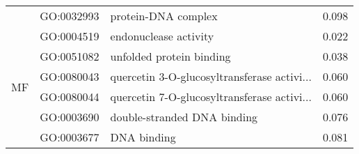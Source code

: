 \begin{longtable}{lllr}
   & GO:0032993 &                          protein-DNA complex &         0.098 \\
\cline{1-4}
\multirow{6}{*}{MF} & GO:0004519 &                        endonuclease activity &         0.022 \\
   & GO:0051082 &                     unfolded protein binding &         0.038 \\
   & GO:0080043 &  quercetin 3-O-glucosyltransferase activi... &         0.060 \\
   & GO:0080044 &  quercetin 7-O-glucosyltransferase activi... &         0.060 \\
   & GO:0003690 &                  double-stranded DNA binding &         0.076 \\
   & GO:0003677 &                                  DNA binding &         0.081 \\
\end{longtable}
